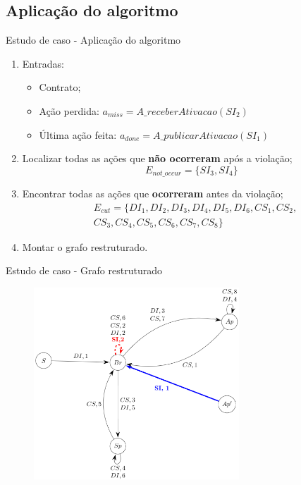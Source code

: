 \documentclass[12pt,xcolor={usenames,dvipsnames}]{beamer}
\begin{document}
\subsection{Aplicação do algoritmo}
\begin{frame}{Estudo de caso - Aplicação do algoritmo}
\begin{enumerate}
	\item Entradas:
		\begin{itemize}
			\item Contrato;
			\item Ação perdida: $a_{miss} = A\_receberAtivacao(SI_{2})$
			\item Última ação feita: $a_{done} = A\_publicarAtivacao(SI_{1})$
		\end{itemize}
	\item Localizar todas as ações que \textbf{não ocorreram} após a violação;
	$$E_{not\_occur} = \{SI_{3}, SI_{4}\}$$
	\item Encontrar todas as ações que \textbf{ocorreram} antes da violação;
	\begin{align}
	& E_{cut} = \{ DI_{1}, DI_{2}, DI_{3}, DI_{4}, DI_{5}, DI_{6}, CS_{1}, CS_{2}, \nonumber \\
	& CS_{3}, CS_{4}, CS_{5}, CS_{6}, CS_{7}, CS_{8} \}\nonumber
	\end{align}
	\item Montar o grafo restruturado.
\end{enumerate}
\end{frame}

\begin{frame}{Estudo de caso - Grafo restruturado}
\begin{figure}[ht]
	\centering
	\includegraphics[width=7.7cm]{./figuras/grafo_final.png}
\end{figure}
\end{frame}
\end{document}
